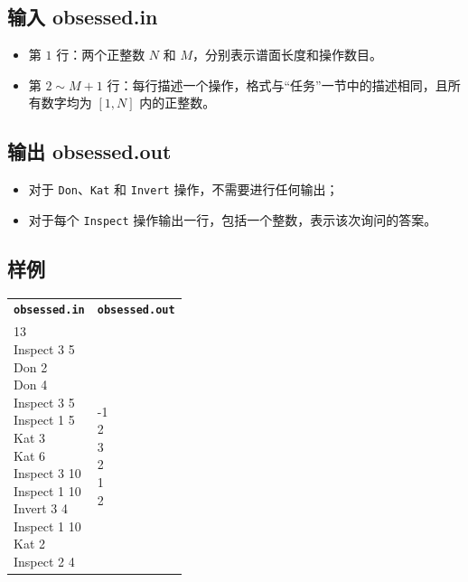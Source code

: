 \documentclass[UTF8, 11pt, a4paper]{article}
\begin{document}
\subsection*{输入 \makebox[0.5em]{} \small{obsessed.in}}
\begin{itemize}
    \item 第 $1$ 行：两个正整数 $N$ 和 $M$，分别表示谱面长度和操作数目。
    \item 第 $2 \sim M + 1$ 行：每行描述一个操作，格式与“任务”一节中的描述相同，且所有数字均为 $[1, N]$ 内的正整数。
\end{itemize}

\subsection*{输出 \makebox[0.5em]{} \small{obsessed.out}}
\begin{itemize}
    \item 对于 \texttt{Don}、\texttt{Kat} 和 \texttt{Invert} 操作，不需要进行任何输出；
    \item 对于每个 \texttt{Inspect} 操作输出一行，包括一个整数，表示该次询问的答案。
\end{itemize}

\subsection*{样例}
\begin{table}[h]\centering
\begin{tabularx}{0.8 \textwidth}{|X|X|}
\hline
\texttt{\textbf{obsessed.in}} & \texttt{\textbf{obsessed.out}} \\ \hline
{\ttfamily
10 13\newline
Inspect 3 5\newline
Don 2\newline
Don 4\newline
Inspect 3 5\newline
Inspect 1 5\newline
Kat 3\newline
Kat 6\newline
Inspect 3 10\newline
Inspect 1 10\newline
Invert 3 4\newline
Inspect 1 10\newline
Kat 2\newline
Inspect 2 4
} & {\ttfamily
-1\newline
-1\newline
2\newline
3\newline
2\newline
1\newline
2
}
\\ \hline
\end{tabularx}\end{table}
\end{document}

